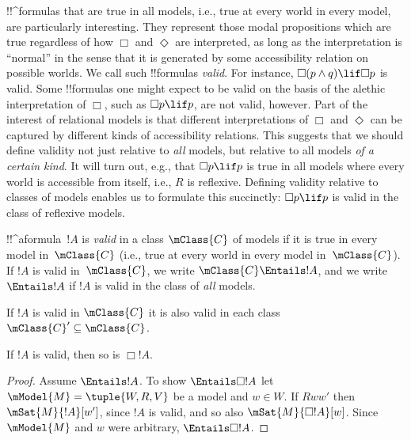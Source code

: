 \documentclass[../../../include/open-logic-section]{subfiles}
\begin{document}


\begin{explain}
  !!^{formula}s that are true in all models, i.e., true at every world
  in every model, are particularly interesting. They represent those
  modal propositions which are true regardless of how $\Box$ and
  $\Diamond$ are interpreted, as long as the interpretation is
  ``normal'' in the sense that it is generated by some accessibility
  relation on possible worlds. We call such !!{formula}s
  \emph{valid}. For instance, $\Box(p \land q) \lif \Box p$ is
  valid. Some !!{formula}s one might expect to be valid on the basis
  of the alethic interpretation of $\Box$, such as $\Box p \lif p$,
  are not valid, however.  Part of the interest of relational models
  is that different interpretations of $\Box$ and $\Diamond$ can be
  captured by different kinds of accessibility relations. This
  suggests that we should define validity not just relative to
  \emph{all} models, but relative to all models \emph{of a certain
    kind}. It will turn out, e.g., that $\Box p \lif p$ is true in all
  models where every world is accessible from itself, i.e., $R$ is
  reflexive. Defining validity relative to classes of models enables
  us to formulate this succinctly: $\Box p \lif p$ is valid in the
  class of reflexive models.
\end{explain}

\begin{defn}
  !!^a{formula}~$!A$ is \emph{valid} in a class $\mClass{C}$ of
  models if it is true in every model in~$\mClass{C}$ (i.e., true at
  every world in every model in~$\mClass{C}$). If $!A$ is valid
  in~$\mClass{C}$, we write $\mClass{C} \Entails !A$, and we
  write $\Entails !A$ if $!A$ is valid in the class of
  \emph{all} models.
\end{defn}

\begin{prop}
  If $!A$ is valid in $\mClass{C}$ it is also valid in each class
  $\mClass{C}' \subseteq \mClass{C}$.
\end{prop}

\begin{prop}
  If $!A$ is valid, then so is $\Box!A$. 
\end{prop}

\begin{proof}
  Assume $\Entails !A$. To show $\Entails \Box!A$ let $\mModel{M} =
  \tuple{W, R, V}$ be a model and $w \in W$. If $Rww'$ then
  $\mSat{M}{!A}[w']$, since $!A$ is valid, and so also
  $\mSat{M}{\Box!A}[w]$. Since $\mModel{M}$ and $w$ were
  arbitrary, $\Entails \Box!A$.
\end{proof}
\end{document}
